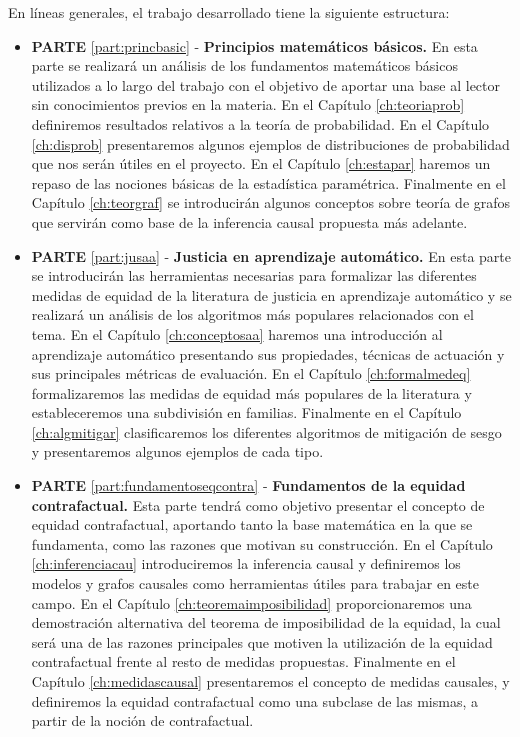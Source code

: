 \documentclass[oneside,openright,titlepage,numbers=noenddot,openany,headinclude,footinclude=true,
cleardoublepage=empty,abstractoff,BCOR=5mm,paper=a4,fontsize=12pt,main=spanish]{scrreprt}
\begin{document}
En líneas generales, el trabajo desarrollado tiene la siguiente estructura:\vspace{2mm}

\begin{itemize}
    \item \textbf{PARTE} \ref{part:princbasic} - \textbf{Principios matemáticos básicos.} En esta parte se realizará un análisis de los fundamentos matemáticos básicos utilizados a lo largo del trabajo con el objetivo de aportar una base al lector sin conocimientos previos en la materia. En el Capítulo \ref{ch:teoriaprob} definiremos resultados relativos a la teoría de probabilidad. En el Capítulo \ref{ch:disprob} presentaremos algunos ejemplos de distribuciones de probabilidad que nos serán útiles en el proyecto. En el Capítulo \ref{ch:estapar} haremos un repaso de las nociones básicas de la estadística paramétrica. Finalmente en el Capítulo \ref{ch:teorgraf} se introducirán algunos conceptos sobre teoría de grafos que servirán como base de la inferencia causal propuesta más adelante.
    \clearpage
    \item \textbf{PARTE} \ref{part:jusaa} - \textbf{Justicia en aprendizaje automático.} En esta parte se introducirán las herramientas necesarias para formalizar las diferentes medidas de equidad de la literatura de justicia en aprendizaje automático y se realizará un análisis de los algoritmos más populares relacionados con el tema. En el Capítulo \ref{ch:conceptosaa} haremos una introducción al aprendizaje automático presentando sus propiedades, técnicas de actuación y sus principales métricas de evaluación. En el Capítulo \ref{ch:formalmedeq} formalizaremos las medidas de equidad más populares de la literatura y estableceremos una subdivisión en familias. Finalmente en el Capítulo \ref{ch:algmitigar} clasificaremos los diferentes algoritmos de mitigación de sesgo y presentaremos algunos ejemplos de cada tipo. \vspace{3mm}
    \item \textbf{PARTE} \ref{part:fundamentoseqcontra} - \textbf{Fundamentos de la equidad contrafactual.} Esta parte tendrá como objetivo presentar el concepto de equidad contrafactual, aportando tanto la base matemática en la que se fundamenta, como las razones que motivan su construcción. En el Capítulo \ref{ch:inferenciacau} introduciremos la inferencia causal y definiremos los modelos y grafos causales como herramientas útiles para trabajar en este campo. En el Capítulo \ref{ch:teoremaimposibilidad} proporcionaremos una demostración alternativa del teorema de imposibilidad de la equidad, la cual será una de las razones principales que motiven la utilización de la equidad contrafactual frente al resto de medidas propuestas. Finalmente en el Capítulo \ref{ch:medidascausal} presentaremos el concepto de medidas causales, y definiremos la equidad contrafactual como una subclase de las mismas, a partir de la noción de contrafactual. \vspace{3mm}

\end{itemize}
\end{document}
